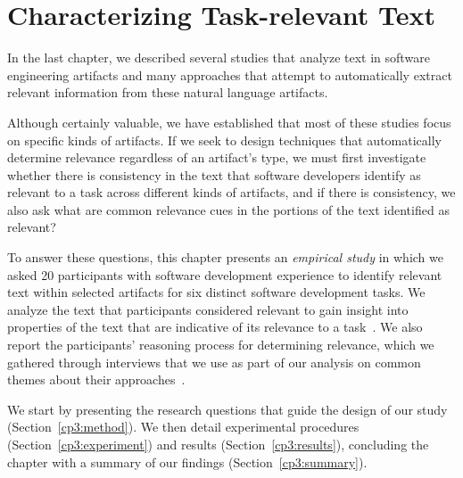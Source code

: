 \setcounter{chapter}{2}


\chapter{Characterizing Task-relevant Text}
\label{ch:characterizing}



In the last chapter,
we described several studies that analyze text in software engineering artifacts
and many approaches that attempt to automatically extract relevant information from
these natural language artifacts.


Although certainly valuable,
we have established that
most of these studies focus on specific kinds of artifacts.
If we seek to design
techniques that automatically determine relevance regardless of an artifact's type,
we must first investigate
whether
there is consistency in the text
that software developers identify as relevant to a task across
different kinds of artifacts, and if there is consistency, we also ask
what are common relevance cues in the portions of
the text identified as relevant?





To answer these questions, 
this chapter presents an
\textit{empirical study} in which we asked 20 participants with
software development experience to identify relevant text within
selected artifacts for six distinct software development tasks.
We analyze the text that participants considered relevant 
to gain insight into properties of the text 
that are indicative of its relevance to a task~\cite{das2014frame, jurafsky2014speech}. 
We also report the participants'
reasoning process for determining relevance,
which we gathered through interviews
that we use as part of our analysis on
common themes about their approaches~\cite{spencer2009sorting}.



We start by presenting the research questions that guide 
the design of our study (Section~\ref{cp3:method}).
We then detail experimental procedures (Section~\ref{cp3:experiment}) 
and results (Section~\ref{cp3:results}),
concluding the chapter with a summary of our findings (Section~\ref{cp3:summary}).












